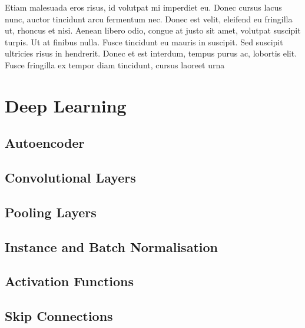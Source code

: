 Etiam malesuada eros risus, id volutpat mi imperdiet eu. Donec cursus lacus nunc, auctor tincidunt arcu fermentum nec. Donec est velit, eleifend eu fringilla ut, rhoncus et nisi. Aenean libero odio, congue at justo sit amet, volutpat suscipit turpis. Ut at finibus nulla. Fusce tincidunt eu mauris in suscipit. Sed suscipit ultricies risus in hendrerit. Donec et est interdum, tempus purus ac, lobortis elit. Fusce fringilla ex tempor diam tincidunt, cursus laoreet urna

\section{Deep Learning}

\subsection{Autoencoder}

\subsection{Convolutional Layers}

\subsection{Pooling Layers}

\subsection{Instance and Batch Normalisation}

\subsection{Activation Functions}

\subsection{Skip Connections}


\cite{mcculloch1943logical}
\cite{Greff}
\cite{Hinton}
\cite{Jaderberg}
\cite{Chen}
\cite{Isola}
\cite{Mao}
\cite{Greff2015}
\cite{Batenburg2013}
\cite{Xu2015}
\cite{Gregor2014}
\cite{Jin2016}
\cite{Bora}
\cite{Dumoulin2016}
\cite{Radford2015}
\cite{Ronneberger2015}
\cite{Yeh2016}
\cite{Eigen2013}
\cite{Jain2009}
\cite{Xie2012}
\cite{Zhang}
\cite{Burger2012}
\cite{Goodfellow2014}
\cite{Han2016}
\cite{Mirza2014}
\cite{Zhang2016}

